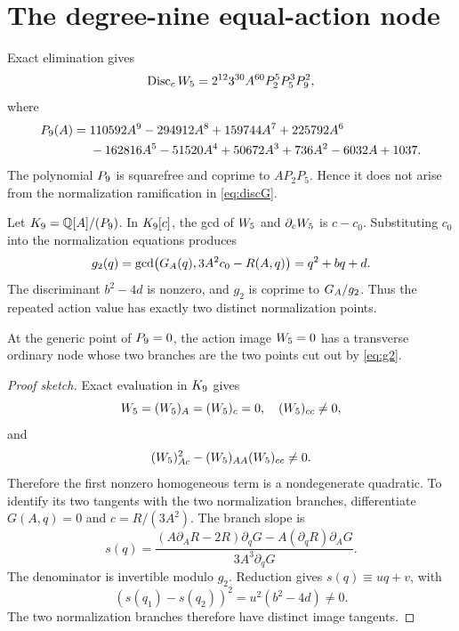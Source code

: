 \section{The degree-nine equal-action node}

Exact elimination gives
\begin{equation}
\operatorname{Disc}_cW_5
=2^{12}3^{30}A^{60}P_2^5P_5^3P_9^2,                       \label{eq:discW}
\end{equation}
where
\begin{align}
P_9(A)={}&110592A^9-294912A^8+159744A^7+225792A^6\notag\\
&-162816A^5-51520A^4+50672A^3+736A^2-6032A+1037.           \label{eq:P9}
\end{align}
The polynomial \(P_9\) is squarefree and coprime to \(AP_2P_5\).  Hence it
does not arise from the normalization ramification in \eqref{eq:discG}.

Let \(K_9=\mathbb{Q}[A]/(P_9)\).  In \(K_9[c]\), the gcd of \(W_5\) and
\(\partial_cW_5\) is \(c-c_0\).  Substituting \(c_0\) into the normalization
equations produces
\begin{equation}
g_2(q)=\gcd\bigl(G_A(q),3A^2c_0-R(A,q)\bigr)=q^2+bq+d.      \label{eq:g2}
\end{equation}
The discriminant \(b^2-4d\) is nonzero, and \(g_2\) is coprime to
\(G_A/g_2\).  Thus the repeated action value has exactly two distinct
normalization points.

\begin{theorem}\label{thm:node}
At the generic point of \(P_9=0\), the action image \(W_5=0\) has a
transverse ordinary node whose two branches are the two points cut out by
\eqref{eq:g2}.
\end{theorem}

\begin{proof}[Proof sketch]
Exact evaluation in \(K_9\) gives
\[
W_5=(W_5)_A=(W_5)_c=0,
\quad
(W_5)_{cc}\ne0,
\]
and
\begin{equation}
(W_5)_{Ac}^2-(W_5)_{AA}(W_5)_{cc}\ne0.                    \label{eq:tangentdisc}
\end{equation}
Therefore the first nonzero homogeneous term is a nondegenerate quadratic.
To identify its two tangents with the two normalization branches, differentiate
\(G(A,q)=0\) and \(c=R/(3A^2)\).  The branch slope is
\begin{equation}
s(q)=\frac{(A\partial_AR-2R)\partial_qG
-A(\partial_qR)\partial_AG}
{3A^3\partial_qG}.                                          \label{eq:slope}
\end{equation}
The denominator is invertible modulo \(g_2\).  Reduction gives
\(s(q)\equiv uq+v\), with
\[
(s(q_1)-s(q_2))^2=u^2(b^2-4d)\ne0.
\]
The two normalization branches therefore have distinct image tangents.
\end{proof}

